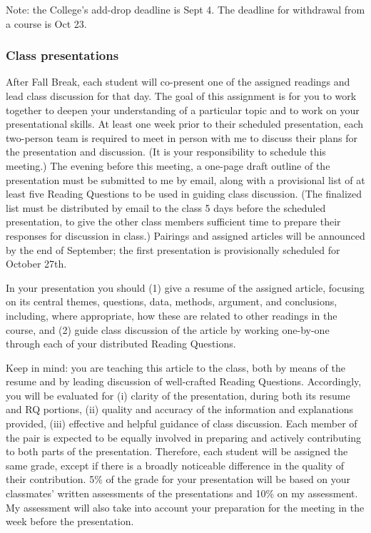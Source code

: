 \documentclass[doc,12pt]{apa6}
\begin{document}
Note: the College's add-drop deadline is Sept 4. The deadline for
withdrawal from a course is Oct 23.

\subsubsection{Class presentations}\label{class-presentations}

After Fall Break, each student will co-present one of the assigned
readings and lead class discussion for that day. The goal of this
assignment is for you to work together to deepen your understanding of a
particular topic and to work on your presentational skills. At least one
week prior to their scheduled presentation, each two-person team is
required to meet in person with me to discuss their plans for the
presentation and discussion. (It is your responsibility to schedule this
meeting.) The evening before this meeting, a one-page draft outline of
the presentation must be submitted to me by email, along with a
provisional list of at least five Reading Questions to be used in
guiding class discussion. (The finalized list must be distributed by
email to the class 5 days before the scheduled presentation, to give the
other class members sufficient time to prepare their responses for
discussion in class.) Pairings and assigned articles will be announced
by the end of September; the first presentation is provisionally
scheduled for October 27th.

In your presentation you should (1) give a resume of the assigned
article, focusing on its central themes, questions, data, methods,
argument, and conclusions, including, where appropriate, how these are
related to other readings in the course, and (2) guide class discussion
of the article by working one-by-one through each of your distributed
Reading Questions.

Keep in mind: you are teaching this article to the class, both by means
of the resume and by leading discussion of well-crafted Reading
Questions. Accordingly, you will be evaluated for (i) clarity of the
presentation, during both its resume and RQ portions, (ii) quality and
accuracy of the information and explanations provided, (iii) effective
and helpful guidance of class discussion. Each member of the pair is
expected to be equally involved in preparing and actively contributing
to both parts of the presentation. Therefore, each student will be
assigned the same grade, except if there is a broadly noticeable
difference in the quality of their contribution. 5\% of the grade for
your presentation will be based on your classmates' written assessments
of the presentations and 10\% on my assessment. My assessment will also
take into account your preparation for the meeting in the week before
the presentation.
\end{document}
